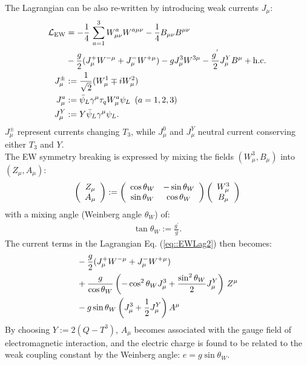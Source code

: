 The Lagrangian can be also re-written by introducing weak currents $J_\mu$:
\begin{align}
\mathcal{L}_{\mathrm{EW}} & = -\frac{1}{4} \, \sum_{a=1}^3 W^a_{\mu\nu} W^{a\mu\nu}-\frac{1}{4}B_{\mu\nu} B^{\mu\nu} \nonumber \\
& -\frac{g}{2} (J_\mu^+ W^{-\mu} + J_\mu^- W^{+\mu}) -g J_\mu^3 W^{3\mu} - \frac{g^{'}}{2}J_\mu^YB^\mu  + \mathrm{h.c.}  \nonumber \\
 J^{\pm}_\mu & := \frac{1}{\sqrt{2}} (W_\mu^1\mp iW_\mu^2) \nonumber \\
 J^a_\mu & := \bar{\psi}_L \gamma^\mu \tau_q W_\mu^a \psi_L  \,\,\, (a=1,2,3) \nonumber \\
 J^Y_\mu & := Y \bar{\psi}_L \gamma^\mu  \psi_L.
\label{eq::EWLag2}
\end{align}
$J_\mu^\pm$ represent currents changing $T_3$, while $J_\mu^0$ and $J_\mu^Y$ neutral current conserving either $T_3$ and $Y$. \\

The EW symmetry breaking is expressed by mixing the fields $(W_\mu^3, B_\mu)$ into $(Z_\mu, A_\mu)$:
\begin{align}
\left( \begin{array}{c} Z_\mu \\ A_\mu \end{array} \right) := 
     \left(
   \begin{array}{cc}
     \cos{\theta_W} &  -\sin{\theta_W} \\ 
     \sin{\theta_W} &  \cos{\theta_W} 
   \end{array}
     \right)
 \left( \begin{array}{c} W_\mu^3 \\ B_\mu \end{array} \right)
\end{align}
with a mixing angle (Weinberg angle $\theta_W$) of:
\begin{align}
\tan{\theta_W} := \frac{g^{'}}{g}.
\end{align}
%
The current terms in the Lagrangian Eq. (\ref{eq::EWLag2}) then becomes:
\begin{align}
 & -\frac{g}{2} (J_\mu^+ W^{-\mu} + J_\mu^- W^{+\mu})  \nonumber \\
 & + \frac{g}{\cos{\theta_W}} \left( -\cos^2{\theta_W} J_\mu^3 + \frac{\sin^2{\theta_W}}{2} J_\mu^Y  \right) \, Z^{\mu}  \nonumber \\
 & - g\sin{\theta_W} \left( J_\mu^3 + \frac{1}{2} J_\mu^Y \right) A^\mu 
\end{align}
By choosing $Y := 2(Q-T^3)$, $A_\mu$ becomes associated with the gauge field of electromagnetic interaction, 
and the electric charge is found to be related to the weak coupling constant by the Weinberg angle: $e=g\sin{\theta_W}$. \\


